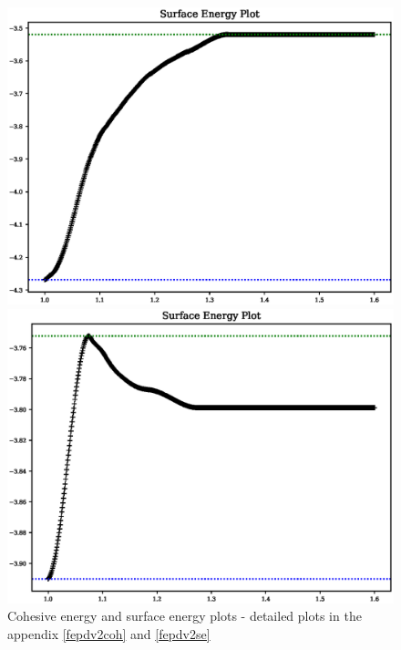 \begin{figure}[ht]
  \centering
  \begin{minipage}[b]{0.4\linewidth}
    \centering
    \includegraphics[width=.98\linewidth]{chapters/potentials_fe_pd_ru/pot_fepd_fcc_2/fe_surface_energy.eps} 
  \end{minipage}%
  \begin{minipage}[b]{0.4\linewidth}
    \centering
    \includegraphics[width=.98\linewidth]{chapters/potentials_fe_pd_ru/pot_fepd_fcc_2/pd_surface_energy.eps} 
  \end{minipage}%
	\caption{Cohesive energy and surface energy plots - detailed plots in the appendix \ref{fepdv2coh} and \ref{fepdv2se}}  
\label{fig:v2plots}
\end{figure}
\FloatBarrier

